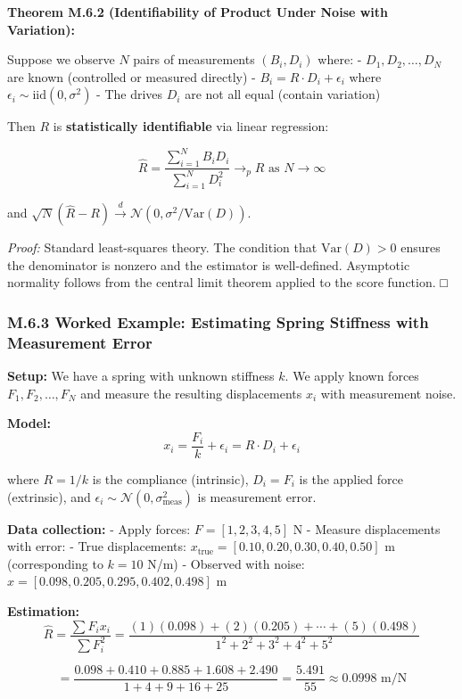 \documentclass[
]{article}
\begin{document}
\textbf{Theorem M.6.2 (Identifiability of Product Under Noise with
Variation):}

Suppose we observe \(N\) pairs of measurements \((B_i, D_i)\) where: -
\(D_1, D_2, \ldots, D_N\) are known (controlled or measured directly) -
\(B_i = R \cdot D_i + \epsilon_i\) where
\(\epsilon_i \sim \text{iid}(0, \sigma^2)\) - The drives \(D_i\) are not
all equal (contain variation)

Then \(R\) is \textbf{statistically identifiable} via linear regression:

\[\widehat{R} = \frac{\sum_{i=1}^N B_i D_i}{\sum_{i=1}^N D_i^2} \to_p R \text{ as } N \to \infty\]

and
\(\sqrt{N}(\widehat{R} - R) \xrightarrow{d} \mathcal{N}(0, \sigma^2 / \text{Var}(D))\).

\emph{Proof:} Standard least-squares theory. The condition that
\(\text{Var}(D) > 0\) ensures the denominator is nonzero and the
estimator is well-defined. Asymptotic normality follows from the central
limit theorem applied to the score function. □

\subsubsection{M.6.3 Worked Example: Estimating Spring Stiffness with
Measurement
Error}\label{m.6.3-worked-example-estimating-spring-stiffness-with-measurement-error}

\textbf{Setup:} We have a spring with unknown stiffness \(k\). We apply
known forces \(F_1, F_2, \ldots, F_N\) and measure the resulting
displacements \(x_i\) with measurement noise.

\textbf{Model:}
\[x_i = \frac{F_i}{k} + \epsilon_i = R \cdot D_i + \epsilon_i\]

where \(R = 1/k\) is the compliance (intrinsic), \(D_i = F_i\) is the
applied force (extrinsic), and
\(\epsilon_i \sim \mathcal{N}(0, \sigma^2_{\text{meas}})\) is
measurement error.

\textbf{Data collection:} - Apply forces: \(F = [1, 2, 3, 4, 5]\) N -
Measure displacements with error: - True displacements:
\(x_{\text{true}} = [0.10, 0.20, 0.30, 0.40, 0.50]\) m (corresponding to
\(k = 10\) N/m) - Observed with noise:
\(x = [0.098, 0.205, 0.295, 0.402, 0.498]\) m

\textbf{Estimation:}
\[\widehat{R} = \frac{\sum F_i x_i}{\sum F_i^2} = \frac{(1)(0.098) + (2)(0.205) + \cdots + (5)(0.498)}{1^2 + 2^2 + 3^2 + 4^2 + 5^2}\]

\[= \frac{0.098 + 0.410 + 0.885 + 1.608 + 2.490}{1 + 4 + 9 + 16 + 25} = \frac{5.491}{55} \approx 0.0998 \text{ m/N}\]
\end{document}
